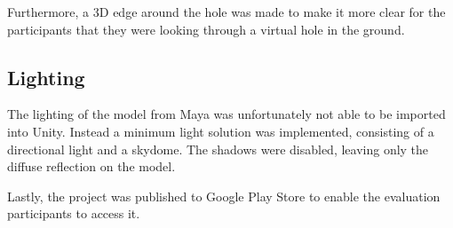Furthermore, a 3D edge around the hole was made to make it more clear for the participants that they were looking through a virtual hole in the ground.

\subsection{Lighting}
The lighting of the model from Maya was unfortunately not able to be imported into Unity. Instead a minimum light solution was implemented, consisting of a directional light and a skydome. The shadows were disabled, leaving only the diffuse reflection on the model.

Lastly, the project was published to Google Play Store to enable the evaluation participants to access it.

